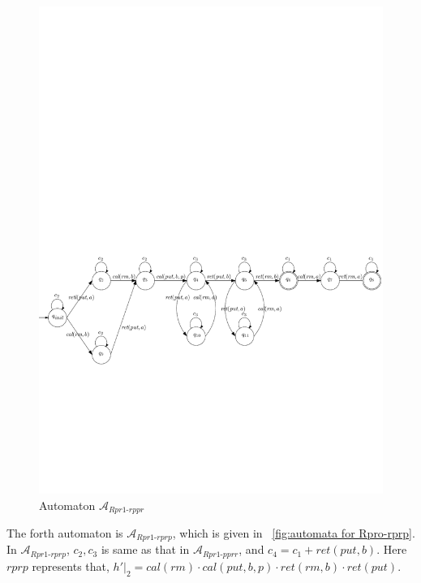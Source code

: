 \begin{figure}[htbp]
  \centering
  \includegraphics[width=1 \textwidth]{PIC_AUTO_UNMATCHED_Rpr1-rppr.pdf}
  \caption{Automaton $\mathcal{A}_{\textit{Rpr1-rppr}}$}
  \label{fig:automata for Rpro-rppr}
\end{figure}


The forth automaton is $\mathcal{A}_{\textit{Rpr1-rprp}}$, which is given in \figurename~\ref{fig:automata for Rpro-rprp}. In $\mathcal{A}_{\textit{Rpr1-rprp}}$, $c_2, c_3$ is same as that in $\mathcal{A}_{\textit{Rpr1-pprr}}$, and $c_4=c_1 + \textit{ret}(put,b)$. Here $\textit{rprp}$ represents that, $h' \vert_{2} = \textit{cal}(\textit{rm}) \cdot \textit{cal}(\textit{put},b,p) \cdot \textit{ret}(\textit{rm},b) \cdot \textit{ret}(\textit{put})$.

